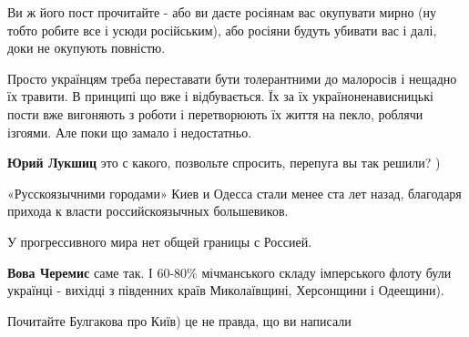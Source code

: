 \begin{itemize}
\begin{itemize}
Ви ж його пост прочитайте - або ви даєте росіянам вас окупувати мирно (ну тобто
робите все і усюди російським), або росіяни будуть убивати вас і далі, доки не
окупують повністю.

Просто українцям треба переставати бути толерантними до малоросів і нещадно їх
травити. В принципі що вже і відбувається. Їх за їх україноненависницькі пости
вже вигоняють з роботи і перетворюють їх життя на пекло, роблячи ізгоями. Але
поки що замало і недостатньо.


 
\textbf{Юрий Лукшиц} это с какого, позвольте спросить, перепуга вы так решили? )

\end{itemize}

 

«Русскоязычними городами» Киев и Одесса стали менее ста лет назад, благодаря
прихода к власти российскоязычных большевиков.

У прогрессивного мира нет общей границы с Россией.

\begin{itemize}
 
\textbf{Вова Черемис} саме так. І 60-80\% мічманського складу імперського флоту були українці - вихідці з південних країв Миколаївщині, Херсонщини і Одеещини).

 
Почитайте Булгакова про Київ) це не правда, що ви написали

 

\end{itemize}
\end{itemize}
